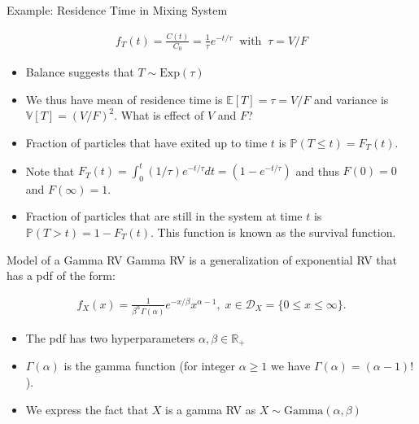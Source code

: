 \documentclass[9pt]{beamer}
\begin{document}
%
\begin{frame}{Example: Residence Time in Mixing System}

\begin{block}{}
\begin{align}
f_T(t)=\frac{C(t)}{C_0}= \frac{1}{\tau}e^{-t/\tau}\;\; \textrm{with}\;\; \tau=V/F
\end{align}
\end{block}
\begin{itemize}
\item Balance suggests that $T\sim\textrm{Exp}(\tau)$  
\item We thus have mean of residence time is $\mathbb{E}[T]=\tau=V/F$ and variance is $\mathbb{V}[T]=(V/F)^2$.  What is effect of $V$ and $F$? 
\item Fraction of particles that have exited up to time $t$ is $\mathbb{P}(T\leq t)=F_T(t)$. 
\item Note that $F_T(t)=\int_{0}^t(1/\tau)e^{-t/\tau}dt=(1-e^{-t/\tau})$ and thus $F(0)=0$ and $F(\infty)=1$.
\item Fraction of particles that are still in the system at time $t$  is $\mathbb{P}(T>t)=1-F_T(t)$. This function is known as the survival function. 
\end{itemize}
\end{frame}

%
\begin{frame}{Model of a Gamma RV}
Gamma RV is a generalization of exponential RV that has a pdf of the form:
\begin{block}{}
\begin{align*}
f_X(x)=\frac{1}{\beta^\alpha \Gamma(\alpha)}e^{-x/\beta}x^{\alpha-1},\; x\in \mathcal{D}_X=\{0\leq x\leq \infty\}.
\end{align*}
\end{block}
\begin{itemize}
\setlength{\itemsep}{10pt}
\item The pdf has two hyperparameters $\alpha,\beta\in \mathbb{R}_+$
\item $\Gamma(\alpha)$ is the gamma function (for integer $\alpha\geq 1$ we have $\Gamma(\alpha)=(\alpha-1)!$). 
\item We express the fact that $X$ is a gamma RV as $X\sim \textrm{Gamma}(\alpha,\beta)$
\end{itemize}

\end{frame}
\end{document}
